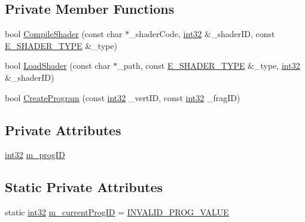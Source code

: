 \subsection*{Private Member Functions}
\begin{DoxyCompactItemize}
\item 
bool \mbox{\hyperlink{classpad_1_1gfx_1_1_shader_a17edbaae92b607880efa4e79a5a6adb9}{Compile\+Shader}} (const char $\ast$\+\_\+shader\+Code, \mbox{\hyperlink{namespacepad_a7faacd72761782d8adef66f2feba3c21}{int32}} \&\+\_\+shader\+ID, const \mbox{\hyperlink{namespacepad_1_1gfx_a04785a7d8a9087a9f0f2459a99a068a6}{E\+\_\+\+S\+H\+A\+D\+E\+R\+\_\+\+T\+Y\+PE}} \&\+\_\+type)
\item 
bool \mbox{\hyperlink{classpad_1_1gfx_1_1_shader_a4adbd190355e4920d4739130d651778a}{Load\+Shader}} (const char $\ast$\+\_\+path, const \mbox{\hyperlink{namespacepad_1_1gfx_a04785a7d8a9087a9f0f2459a99a068a6}{E\+\_\+\+S\+H\+A\+D\+E\+R\+\_\+\+T\+Y\+PE}} \&\+\_\+type, \mbox{\hyperlink{namespacepad_a7faacd72761782d8adef66f2feba3c21}{int32}} \&\+\_\+shader\+ID)
\item 
bool \mbox{\hyperlink{classpad_1_1gfx_1_1_shader_a79cc2be52055b9801745cd17e58b1b13}{Create\+Program}} (const \mbox{\hyperlink{namespacepad_a7faacd72761782d8adef66f2feba3c21}{int32}} \+\_\+vert\+ID, const \mbox{\hyperlink{namespacepad_a7faacd72761782d8adef66f2feba3c21}{int32}} \+\_\+frag\+ID)
\end{DoxyCompactItemize}
\subsection*{Private Attributes}
\begin{DoxyCompactItemize}
\item 
\mbox{\hyperlink{namespacepad_a7faacd72761782d8adef66f2feba3c21}{int32}} \mbox{\hyperlink{classpad_1_1gfx_1_1_shader_aad9b828da5a2b4c510a186f23f2cb633}{m\+\_\+prog\+ID}}
\end{DoxyCompactItemize}
\subsection*{Static Private Attributes}
\begin{DoxyCompactItemize}
\item 
static \mbox{\hyperlink{namespacepad_a7faacd72761782d8adef66f2feba3c21}{int32}} \mbox{\hyperlink{classpad_1_1gfx_1_1_shader_ad9eaa6681fa2cc603230d1ed006c6fe3}{m\+\_\+current\+Prog\+ID}} = \mbox{\hyperlink{_shader_8cpp_a9fe0beb08874420b17d7de8e9479f59c}{I\+N\+V\+A\+L\+I\+D\+\_\+\+P\+R\+O\+G\+\_\+\+V\+A\+L\+UE}}
\end{DoxyCompactItemize}


